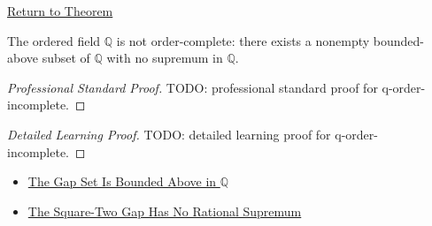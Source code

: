 \newpage
{}
\label{prf:q-order-incomplete}

\begin{remark*}[Return]
\hyperref[cor:q-order-incomplete]{Return to Theorem}
\end{remark*}

\begin{corollary*}
The ordered field $\mathbb{Q}$ is not order-complete: there exists a nonempty
bounded-above subset of $\mathbb{Q}$ with no supremum in $\mathbb{Q}$.
\end{corollary*}

\begin{proof}[Professional Standard Proof]
\LRAProofBodyStart
TODO: professional standard proof for q-order-incomplete.
\end{proof}

\begin{proof}[Detailed Learning Proof]
\LRAProofBodyStart
TODO: detailed learning proof for q-order-incomplete.
\end{proof}

\begin{remark*}
\end{remark*}

\begin{dependencies}
\begin{itemize}
  \item \hyperref[prop:gap-set-bounded-above-q]{The Gap Set Is Bounded Above in $\mathbb{Q}$}
  \item \hyperref[thm:gap-set-no-rational-supremum-q]{The Square-Two Gap Has No Rational Supremum}
\end{itemize}
\end{dependencies}

\clearpage
